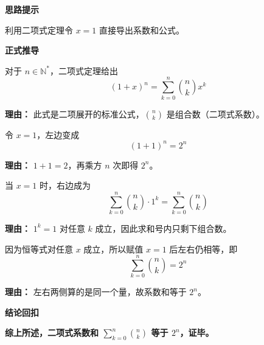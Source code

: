 \begin{proofbox}
	\textbf{\textcolor{CProof}{思路提示}}

	利用二项式定理令 $x=1$ 直接导出系数和公式。

	\medskip
	\textbf{\textcolor{CProof}{正式推导}}
	\begin{description}[style=nextline, leftmargin=2.8em, labelsep=0.5em, itemsep=0.55em]
		\item[\textbf{步骤一（写出定理）：}]
			对于 $n\in\mathbb{N}^*$，二项式定理给出
			\[
				(1+x)^n = \sum_{k=0}^{n} \binom{n}{k} x^k
			\]
			\par\textbf{理由：}
			此式是二项展开的标准公式，$\binom{n}{k}$ 是组合数（二项式系数）。

		\item[\textbf{步骤二（赋值左端）：}]
			令 $x=1$，左边变成
			\[
				(1+1)^n = 2^n
			\]
			\par\textbf{理由：}
			$1+1=2$，再乘方 $n$ 次即得 $2^n$。

		\item[\textbf{步骤三（赋值右端）：}]
			当 $x=1$ 时，右边成为
			\[
				\sum_{k=0}^{n} \binom{n}{k} \cdot 1^k = \sum_{k=0}^{n} \binom{n}{k}
			\]
			\par\textbf{理由：}
			$1^k=1$ 对任意 $k$ 成立，因此求和号内只剩下组合数。

		\item[\textbf{步骤四（等量关系）：}]
			因为恒等式对任意 $x$ 成立，所以赋值 $x=1$ 后左右仍相等，即
			\[
				\sum_{k=0}^{n} \binom{n}{k} = 2^n
			\]
			\par\textbf{理由：}
			左右两侧算的是同一个量，故系数和等于 $2^n$。
	\end{description}

	\medskip
	\textbf{\textcolor{CProof}{结论回扣}}

	\textbf{综上所述，二项式系数和 $\sum_{k=0}^{n} \binom{n}{k}$ 等于 $2^n$，证毕。}
\end{proofbox}
